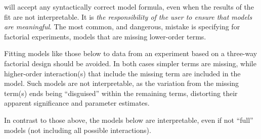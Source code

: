 \documentclass[krantz2]{krantz}\usepackage{knitr}
\begin{document}
\begin{warningbox}
  \Rlang will accept any syntactically correct model formula, even when the results of the fit are not interpretable. It is \emph{the responsibility of the user to ensure that models are meaningful}. The most common, and dangerous, mistake is specifying for factorial experiments, models that are missing lower-order terms.

  Fitting models like those below to data from an experiment based on a three-way factorial design should be avoided. In both cases simpler terms are missing, while higher-order interaction(s) that include the missing term are included in the model. Such models are not interpretable, as the variation from the missing term(s) ends being ``disguised'' within the remaining terms, distorting their apparent significance and parameter estimates.

\begin{knitrout}\footnotesize
{}\color{fgcolor}\begin{kframe}
\begin{alltt}
 \hlopt{~}  \hlopt{+}  \hlopt{+} \hlopt{:} \hlopt{+} \hlopt{:} \hlopt{+} \hlopt{:}
 \hlopt{~}  \hlopt{+}  \hlopt{+}  \hlopt{+} \hlopt{:} \hlopt{+} \hlopt{:} \hlopt{+} \hlopt{:}\hlopt{:}
\end{alltt}
\end{kframe}
\end{knitrout}

  In contrast to those above, the models below are interpretable, even if not ``full'' models (not including all possible interactions).

\begin{knitrout}\footnotesize
{}\color{fgcolor}\begin{kframe}
\begin{alltt}
 \hlopt{~}  \hlopt{+}  \hlopt{+}  \hlopt{+} \hlopt{:} \hlopt{+} \hlopt{:} \hlopt{+} \hlopt{:}
 \hlopt{~}  \hlopt{+}  \hlopt{+} \hlopt{^}
 \hlopt{~}  \hlopt{+}  \hlopt{+}  \hlopt{+} \hlopt{:}
 \hlopt{~}  \hlopt{+}  \hlopt{*} 
\end{alltt}
\end{kframe}
\end{knitrout}

\end{warningbox}
\end{document}
